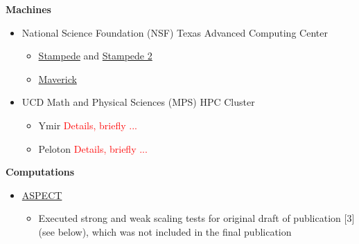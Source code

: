 \documentclass[11pt]{ltxdoc}
\begin{document}
\begin{description}
\begin{description}
\begin{itemize}
      \end{itemize}
      
    \item[] \textbf{Machines}
    
      \vskip 06pt 
      
      \begin{itemize}
        
        \item National Science Foundation (NSF) Texas Advanced Computing Center
      
      \begin{itemize}
      	
        \item \href{https://portal.xsede.org/tacc-stampede}{Stampede} and \href{https://portal.xsede.org/tacc-stampede2}{Stampede 2}
        
        \item \href{https://portal.xsede.org/tacc-maverick}{Maverick} 
        
      \end{itemize}
  
      \item UCD Math and Physical Sciences (MPS) HPC Cluster
      
        \begin{itemize}
      	
          \item Ymir    \textcolor{red}{Details, briefly ...}
        
          \item Peloton  \textcolor{red}{Details, briefly ...}
        
        \end{itemize}
  
      \end{itemize}  

    \item[] \textbf{Computations}
    
      \vskip 06pt
      

      \begin{itemize}
      	
        \item \href{https://geodynamics.org/cig/software/aspect/}{ASPECT}
              
          \begin{itemize}        
              
            \item Executed strong and weak scaling tests for original draft of publication [3] (see below), which was not included in the final publication              


\end{itemize}
\end{itemize}
\end{description}
\end{description}
\end{document}
